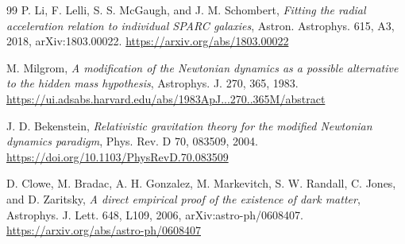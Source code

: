 \documentclass[11pt]{article}
\begin{document}
\begin{thebibliography}{99}
P. Li, F. Lelli, S. S. McGaugh, and J. M. Schombert,
\emph{Fitting the radial acceleration relation to individual SPARC galaxies},
Astron. Astrophys. 615, A3, 2018, arXiv:1803.00022.
\url{https://arxiv.org/abs/1803.00022}

M. Milgrom,
\emph{A modification of the Newtonian dynamics as a possible alternative to the hidden mass hypothesis},
Astrophys. J. 270, 365, 1983.
\url{https://ui.adsabs.harvard.edu/abs/1983ApJ...270..365M/abstract}

J. D. Bekenstein,
\emph{Relativistic gravitation theory for the modified Newtonian dynamics paradigm},
Phys. Rev. D 70, 083509, 2004.
\url{https://doi.org/10.1103/PhysRevD.70.083509}

D. Clowe, M. Bradac, A. H. Gonzalez, M. Markevitch, S. W. Randall,
C. Jones, and D. Zaritsky,
\emph{A direct empirical proof of the existence of dark matter},
Astrophys. J. Lett. 648, L109, 2006, arXiv:astro-ph/0608407.
\url{https://arxiv.org/abs/astro-ph/0608407}

\end{thebibliography}
\end{document}
